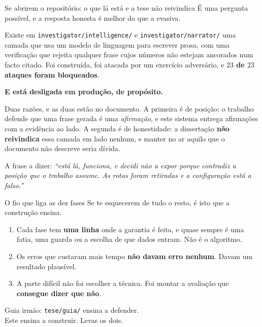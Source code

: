 \documentclass[aspectratio=169]{beamer}
\begin{document}
\begin{frame}{Se abrirem o repositório: o que lá está e a tese não reivindica}
\small
É uma pergunta possível, e a resposta honesta é melhor do que a evasiva.
\vspace{3mm}

Existe em \texttt{investigator/intelligence/} e \texttt{investigator/narrator/} uma camada que usa
um modelo de linguagem para escrever prosa, com uma verificação que rejeita qualquer frase cujos
números não estejam ancorados num facto citado. Foi construída, foi atacada por um exercício
adversário, e \textbf{$23$ de $23$ ataques foram bloqueados}.
\vspace{3mm}

\begin{center}
\textbf{E está desligada em produção, de propósito.}
\end{center}
\vspace{3mm}

Duas razões, e as duas estão no documento. A primeira é de posição: o trabalho defende que uma
frase gerada é uma \emph{afirmação}, e este sistema entrega afirmações com a evidência ao lado.
A segunda é de honestidade: a dissertação \textbf{não reivindica} essa camada em lado nenhum, e
manter no ar aquilo que o documento não descreve seria dívida.
\vspace{3mm}

{\footnotesize A frase a dizer: \emph{``está lá, funciona, e decidi não a expor porque contradiz a
posição que o trabalho assume. As rotas foram retiradas e a configuração está a falso.''}}
\end{frame}

\begin{frame}{O fio que liga as dez fases}
\small
Se te esquecerem de tudo o resto, é isto que a construção ensina.
\vspace{3mm}

\begin{enumerate}
  \item Cada fase tem \textbf{uma linha} onde a garantia é feita, e quase sempre é uma fatia, uma
        guarda ou a escolha de que dados entram. Não é o algoritmo.
  \item Os erros que custaram mais tempo \textbf{não davam erro nenhum}. Davam um resultado
        plausível.
  \item A parte difícil não foi escolher a técnica. Foi montar a avaliação que
        \textbf{consegue dizer que não}.
\end{enumerate}
\vspace{4mm}

\begin{center}
\footnotesize Guia irmão: \texttt{tese/guia/} ensina a defender.\\
Este ensina a construir. Levas os dois.
\end{center}
\end{frame}
\end{document}
